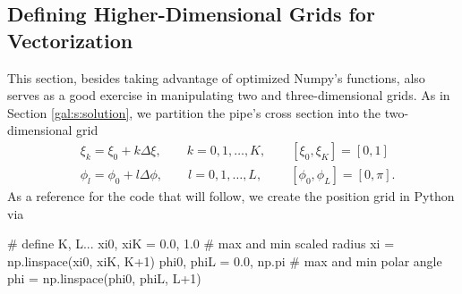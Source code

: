 \documentclass[11pt, a4paper]{article}
\begin{document}
\subsection{Defining Higher-Dimensional Grids for Vectorization}
This section, besides taking advantage of optimized Numpy's functions, also serves as a good exercise in manipulating two and three-dimensional grids. As in Section \ref{gal:s:solution}, we partition the pipe's cross section into the two-dimensional grid
\begin{align*}
	& \xi_{k} = \xi_{0} + k \Delta \xi, \qquad k = 0, 1, \ldots, K, \qquad [\xi_{0}, \xi_{K}] = [0, 1]\\
	& \phi_{l} = \phi_{0} + l \Delta \phi, \qquad l = 0, 1, \ldots, L, \qquad \ [\phi_{0}, \phi_{L}] = [0, \pi].
\end{align*}
As a reference for the code that will follow, we create the position grid in Python via
\begin{python}
# define K, L...
xi0, xiK = 0.0, 1.0                 # max and min scaled radius
xi = np.linspace(xi0, xiK, K+1)
phi0, phiL = 0.0, np.pi             # max and min polar angle
phi = np.linspace(phi0, phiL, L+1)
\end{python}
\end{document}

